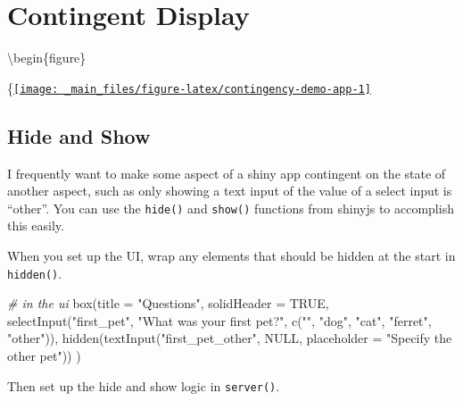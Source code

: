 \documentclass[
]{book}
\newenvironment{Shaded}{\begin{snugshade}}{\end{snugshade}}
\newcommand{\AttributeTok}[1]{\textcolor[rgb]{0.77,0.63,0.00}{#1}}
\newcommand{\CommentTok}[1]{\textcolor[rgb]{0.56,0.35,0.01}{\textit{#1}}}
\newcommand{\ConstantTok}[1]{\textcolor[rgb]{0.00,0.00,0.00}{#1}}
\newcommand{\ControlFlowTok}[1]{\textcolor[rgb]{0.13,0.29,0.53}{\textbf{#1}}}
\newcommand{\FunctionTok}[1]{\textcolor[rgb]{0.00,0.00,0.00}{#1}}
\newcommand{\NormalTok}[1]{#1}
\newcommand{\SpecialCharTok}[1]{\textcolor[rgb]{0.00,0.00,0.00}{#1}}
\newcommand{\StringTok}[1]{\textcolor[rgb]{0.31,0.60,0.02}{#1}}
\begin{document}
\hypertarget{contingency}{%
\chapter{Contingent Display}\label{contingency}}

\textbackslash begin\{figure\}

\{\centering \href{https://shiny.psy.gla.ac.uk/debruine/contingency_demo/}{\texttt{[image: \_main\_files/figure-latex/contingency-demo-app-1]} }

\hypertarget{hide-and-show}{%
\section{Hide and Show}\label{hide-and-show}}

I frequently want to make some aspect of a shiny app contingent on the state of another aspect, such as only showing a text input of the value of a select input is ``other''. You can use the \texttt{hide()} and \texttt{show()} functions from shinyjs to accomplish this easily.

When you set up the UI, wrap any elements that should be hidden at the start in \texttt{hidden()}.

\begin{Shaded}
\begin{Highlighting}[]
\CommentTok{\# in the ui}
\FunctionTok{box}\NormalTok{(}\AttributeTok{title =} \StringTok{"Questions"}\NormalTok{,}
    \AttributeTok{solidHeader =} \ConstantTok{TRUE}\NormalTok{,}
    \FunctionTok{selectInput}\NormalTok{(}\StringTok{"first\_pet"}\NormalTok{, }\StringTok{"What was your first pet?"}\NormalTok{, }
                \FunctionTok{c}\NormalTok{(}\StringTok{""}\NormalTok{, }\StringTok{"dog"}\NormalTok{, }\StringTok{"cat"}\NormalTok{, }\StringTok{"ferret"}\NormalTok{, }\StringTok{"other"}\NormalTok{)),}
    \FunctionTok{hidden}\NormalTok{(}\FunctionTok{textInput}\NormalTok{(}\StringTok{"first\_pet\_other"}\NormalTok{, }\ConstantTok{NULL}\NormalTok{, }
                     \AttributeTok{placeholder =} \StringTok{"Specify the other pet"}\NormalTok{))}
\NormalTok{)}
\end{Highlighting}
\end{Shaded}

Then set up the hide and show logic in \texttt{server()}.

\begin{Shaded}
\end{Shaded}
\end{document}
